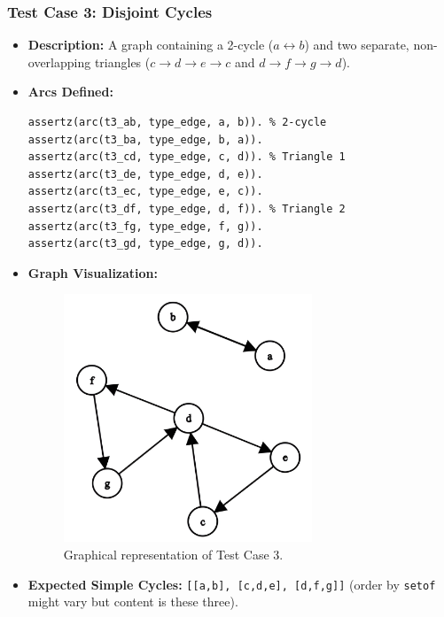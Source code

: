 \documentclass[12pt,a4paper]{article}
\begin{document}
\subsubsection{Test Case 3: Disjoint Cycles}
\begin{itemize}
\item \textbf{Description:} A graph containing a 2-cycle ($a \leftrightarrow b$) and two separate, non-overlapping triangles ($c \rightarrow d \rightarrow e \rightarrow c$ and $d \rightarrow f \rightarrow g \rightarrow d$). 
\item \textbf{Arcs Defined:}
\begin{lstlisting}[style=prologstyle, basicstyle=\ttfamily\footnotesize]
assertz(arc(t3_ab, type_edge, a, b)). % 2-cycle
assertz(arc(t3_ba, type_edge, b, a)).
assertz(arc(t3_cd, type_edge, c, d)). % Triangle 1
assertz(arc(t3_de, type_edge, d, e)).
assertz(arc(t3_ec, type_edge, e, c)).
assertz(arc(t3_df, type_edge, d, f)). % Triangle 2
assertz(arc(t3_fg, type_edge, f, g)).
assertz(arc(t3_gd, type_edge, g, d)).
\end{lstlisting}
\item \textbf{Graph Visualization:}
\begin{figure}[H]
\centering
\includegraphics[width=0.7\textwidth]{img/Test3.png} %
\caption{Graphical representation of Test Case 3.}
\label{fig:testcase3}
\end{figure}
\item \textbf{Expected Simple Cycles:} \texttt{[[a,b], [c,d,e], [d,f,g]]} (order by \texttt{setof} might vary but content is these three).
\end{itemize}
\end{document}
